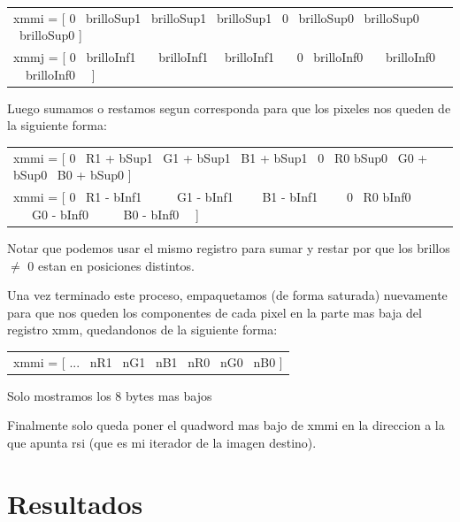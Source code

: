 \documentclass[a4paper]{article}
\begin{document}
\begin{center}
	\begin{tabular}{l}
		xmmi = [ 0 \textpipe\ brilloSup1 \textpipe\ brilloSup1 \textpipe\ brilloSup1 \textpipe\ 0 \textpipe\ brilloSup0 \textpipe\ brilloSup0 \textpipe\ brilloSup0 ] \\
		xmmj = [ 0 \textpipe\ brilloInf1 \ \  \textpipe\ brilloInf1 \ \textpipe\ brilloInf1 \ \ \textpipe\ 0 \textpipe\ brilloInf0 \ \ \textpipe\ brilloInf0 \ \textpipe\ brilloInf0 \ \ ]
	\end{tabular}
\end{center}


Luego sumamos o restamos segun corresponda para que los pixeles nos queden de la siguiente forma:

\begin{center}
	\begin{tabular}{l}
		xmmi = [ 0 \textpipe\ R1 + bSup1 \textpipe\ G1 + bSup1 \textpipe\ B1 + bSup1 \textpipe\ 0 \textpipe\ R0 bSup0 \textpipe\ G0 + bSup0 \textpipe\ B0 + bSup0 ] \\
		
		xmmi = [ 0 \textpipe\ R1 - bInf1 \ \ \ \  \textpipe\ G1 - bInf1 \ \ \ \textpipe\ B1 - bInf1 \ \ \ \textpipe\ 0 \textpipe\ R0 bInf0 \ \ \textpipe\ G0 - bInf0 \ \ \ \ \textpipe\ B0 - bInf0 \ \ ]
		 
	\end{tabular}
\end{center}

Notar que podemos usar el mismo registro para sumar y restar por que los brillos $\neq$ 0 estan en posiciones distintos.

Una vez terminado este proceso, empaquetamos (de forma saturada) nuevamente para que nos queden los componentes de cada pixel en la parte mas baja del registro xmm, quedandonos de la siguiente forma:

\begin{center}
	\begin{tabular}{l}
		xmmi = [ ... \textpipe\ nR1 \textpipe\ nG1 \textpipe\ nB1 \textpipe\ nR0 \textpipe\ nG0 \textpipe\ nB0 ]
	\end{tabular}
	
	Solo mostramos los 8 bytes mas bajos
\end{center}


Finalmente solo queda poner el quadword mas bajo de xmmi en la direccion a la que apunta rsi (que es mi iterador de la imagen destino).

\section{Resultados}
\end{document}
